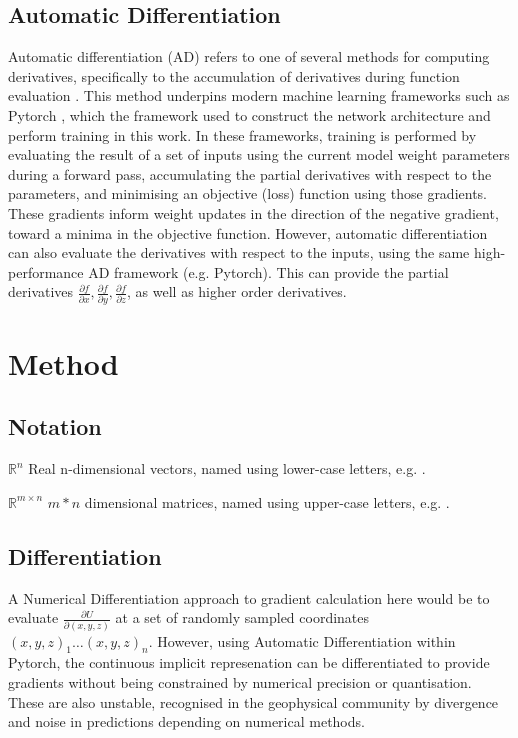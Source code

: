 \documentclass[manuscript.tex]{subfiles}
\begin{document}
\subsection{Automatic Differentiation}
Automatic differentiation (AD) refers to one of several methods for computing derivatives, specifically to the accumulation of derivatives during function evaluation \parencite{baydin2018automatic}.
This method underpins modern machine learning frameworks such as Pytorch \parencite{paszkePyTorchImperativeStyle2019}, which the framework used to construct the network architecture and perform training in this work.
In these frameworks, training is performed by evaluating the result of a set of inputs using the current model weight parameters during a forward pass, accumulating the partial derivatives with respect to the parameters, and minimising an objective (loss) function using those gradients.
These gradients inform weight updates in the direction of the negative gradient, toward a minima in the objective function. 
However, automatic differentiation can also evaluate the derivatives with respect to the inputs, using the same high-performance AD framework (e.g. Pytorch).
This can provide the partial derivatives \(\frac{\partial f}{\partial x}, \frac{\partial f}{\partial y}, \frac{\partial f}{\partial z}\), as well as higher order derivatives.

\section{Method}
\subsection{Notation}
\(\mathbb{R}^n\) Real n-dimensional vectors, named using lower-case letters, e.g. .

\(\mathbb{R}^{m\times{}n}\) \(m*n\) dimensional matrices, named using upper-case letters, e.g. .

\subsection{Differentiation}
A Numerical Differentiation approach to gradient calculation here would be to evaluate \(\frac{\partial{U}}{\partial{(x, y, z)}}\) at a set of randomly sampled coordinates \({(x, y, z)}_1 \dots {(x,y,z)}_n\).
However, using Automatic Differentiation within Pytorch, the continuous implicit represenation can be differentiated to provide gradients without being constrained by numerical precision or quantisation.
These are also unstable, recognised in the geophysical community by divergence and noise in predictions depending on numerical methods.
\end{document}
